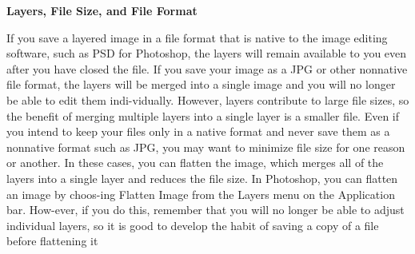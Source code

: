 \documentclass{report}
\begin{document}
    \bigbreak \noindent \bigbreak \noindent 
    \begin{large}
      \textbf{Layers, File Size, and File Format}
    \end{large}
    \bigbreak \noindent 
    If you save a layered image in a file format that is native to the image editing software, such as PSD for Photoshop, the layers will remain available to you even after you have closed the file. If you save your image as a JPG or other nonnative file format, the layers will be merged into a single image and you will no longer be able to edit them indi-vidually. However, layers contribute to large file sizes, so the benefit of merging multiple layers into a single layer is a smaller file.
    \bigbreak \noindent 
    Even if you intend to keep your files only in a native format and never save them as a nonnative format such as JPG, you may want to minimize file size for one reason or another. In these cases, you can flatten the image, which merges all of the layers into a single layer and reduces the file size. In Photoshop, you can flatten an image by choos-ing Flatten Image from the Layers menu on the Application bar. How-ever, if you do this, remember that you will no longer be able to adjust individual layers, so it is good to develop the habit of saving a copy of a file before flattening it
\end{document}
